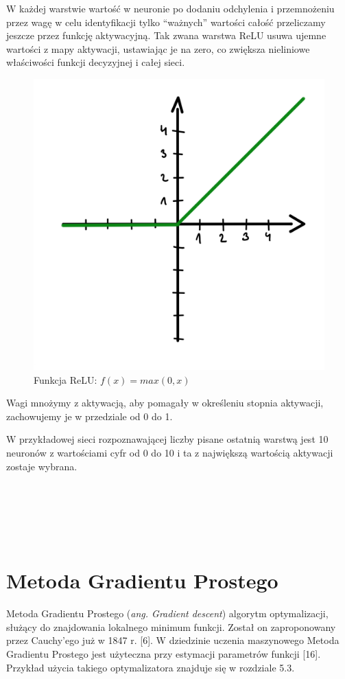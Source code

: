 \documentclass[openright]{xmgr}
\begin{document}
W każdej warstwie  wartość w neuronie po dodaniu odchylenia i przemnożeniu przez wagę w celu identyfikacji tylko “ważnych” wartości całość przeliczamy jeszcze przez funkcję aktywacyjną. 
Tak zwana warstwa ReLU usuwa ujemne wartości z mapy aktywacji, ustawiając je na zero, co zwiększa nieliniowe właściwości funkcji decyzyjnej i całej sieci.
\begin{figure}[!tbh]
\centering
\includegraphics[width=.8\hsize]{fig/4}
\caption{Funkcja ReLU: $f(x) = max(0, x)$\label{RYS.3}}
\end{figure}

 Wagi mnożymy z aktywacją, aby pomagały w określeniu stopnia aktywacji, zachowujemy je w przedziale od 0 do 1.
 
 W przykładowej sieci rozpoznawającej liczby pisane ostatnią warstwą jest 10 neuronów z wartościami cyfr od 0 do 10 i ta z największą wartością aktywacji zostaje wybrana. 
\\
\\
\\
\\
\\
\\

 \section{Metoda Gradientu Prostego\label{s:dsssl}}

\indent \indent Metoda Gradientu Prostego (\textit{ang. Gradient descent}) algorytm optymalizacji, służący do znajdowania lokalnego minimum funkcji.  Został on zaproponowany przez Cauchy'ego już w 1847 r. [6].  W dziedzinie uczenia maszynowego Metoda Gradientu Prostego jest użyteczna przy estymacji parametrów funkcji [16].  Przykład użycia takiego optymalizatora znajduje się w rozdziale 5.3.
\end{document}
